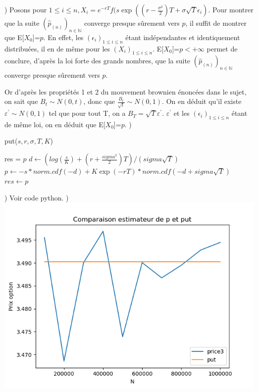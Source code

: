 \documentclass{exam}
\begin{document}
\newline
{}) Posons pour $1 \leq i \leq n, X_i = e^{-rT}f(s \exp ((r-\frac{\sigma^2}{2})T + \sigma \sqrt{T} \epsilon_i)$. Pour montrer que la suite $(\hat{p}_{(n)})_{n \in \mathbb{N}}$ converge presque sûrement vers $p$, il suffit de montrer que E[$X_0$]=$p$. En effet, les $(\epsilon_i)_{1 \leq i \leq n}$ étant indépendantes et identiquement distribuées, il en de même pour les $(X_i)_{1 \leq i \leq n}$. E[$X_0$]=$p < +\infty$ permet de conclure, d'après la loi forte des grands nombres, que la suite $(\hat{p}_{(n)})_{n \in \mathbb{N}}$ converge presque sûrement vers $p$. 

Or d'après les propriétés 1 et 2 du mouvement brownien énoncées dans le sujet, on sait que $B_t \sim N(0,t)$, donc que $\frac{B_t}{\sqrt{t}} \sim N(0,1)$. On en déduit qu'il existe $\varepsilon^{'} \sim N(0,1)$ tel que pour tout T, on a $B_T = \sqrt{T}\varepsilon^{'}$. $\varepsilon^{'}$ et les $(\epsilon_i)_{1 \leq i \leq n}$ étant de même loi, on en déduit que  E[$X_0$]=$p$.
\newline
{})
\begin{algorithm}
\caption{put($s,r,\sigma,T,K$)}
\begin{algorithmic}
\ENSURE res = $p$
\STATE $d \leftarrow (log(\frac{s}{K})+(r+\frac{sigma^2}{2})T)/(sigma\sqrt{T})$
\STATE $p \leftarrow -s * norm.cdf(-d) + K\exp(-rT)*norm.cdf(-d+sigma\sqrt{T})$
\STATE $res \leftarrow p$
\end{algorithmic}
\end{algorithm}
\newline
{}) Voir code python.
\newline
{}) \includegraphics{question17.png}
\end{document}
